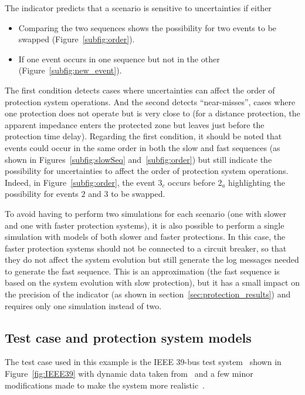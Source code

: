 The indicator predicts that a scenario is sensitive to uncertainties if either

\begin{itemize}
    \item Comparing the two sequences shows the possibility for two events to be swapped (Figure~\ref{subfig:order}).
    \item If one event occurs in one sequence but not in the other (Figure~\ref{subfig:new_event}).
\end{itemize}

The first condition detects cases where uncertainties can affect the order of protection system operations. And the second detects ``near-misses'', \ie cases where one protection does not operate but is very close to (\eg for a distance protection, the apparent impedance enters the protected zone but leaves just before the protection time delay). Regarding the first condition, it should be noted that events could occur in the same order in both the slow and fast sequences (as shown in Figures~\ref{subfig:slowSeq} and~\ref{subfig:order}) but still indicate the possibility for uncertainties to affect the order of protection system operations. Indeed, in Figure~\ref{subfig:order}, the event \(3_c\) occurs before \(2_a\) highlighting the possibility for events \(2\) and \(3\) to be swapped.

To avoid having to perform two simulations for each scenario (one with slower and one with faster protection systems), it is also possible to perform a single simulation with models of both slower and faster protections. In this case, the faster protection systems should not be connected to a circuit breaker, so that they do not affect the system evolution but still generate the log messages needed to generate the fast sequence. This is an approximation (the fast sequence is based on the system evolution with slow protection), but it has a small impact on the precision of the indicator (as shown in section~\ref{sec:protection_results}) and requires only one simulation instead of two.


\subsection{Test case and protection system models}
\label{sec:protection_test_case}

The test case used in this example is the IEEE 39-bus test system~\cite{IEEE39} shown in Figure~\ref{fig:IEEE39} with dynamic data taken from~\cite{IEEE39Dynamic} and a few minor modifications made to make the system more realistic~\cite{ISGT2023_Protections}.

